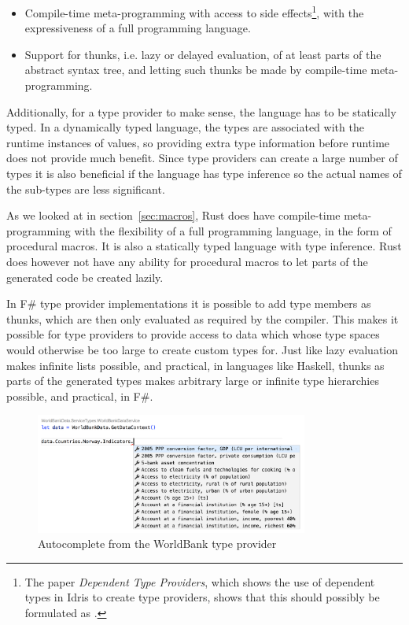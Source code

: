 \begin{itemize}
  \item Compile-time meta-programming with access to side effects\footnote{The paper \emph{Dependent Type Providers}\cite{dependent-type-providers}, which shows the use of dependent types in Idris to create type providers, shows that this should possibly be formulated as .}, with the expressiveness of a full programming language.
  \item Support for thunks, i.e. lazy or delayed evaluation, of at least parts of the abstract syntax tree, and letting such thunks be made by compile-time meta-programming.
\end{itemize}

Additionally, for a type provider to make sense, the language has to be statically typed. In a dynamically typed language, the types are associated with the runtime instances of values, so providing extra type information before runtime does not provide much benefit. Since type providers can create a large number of types it is also beneficial if the language has type inference so the actual names of the sub-types are less significant.

As we looked at in section~\ref{sec:macros}, Rust does have compile-time meta-programming with the flexibility of a full programming language, in the form of procedural macros. It is also a statically typed language with type inference. Rust does however not have any ability for procedural macros to let parts of the generated code be created lazily.

In F\# type provider implementations it is possible to add type members as thunks, which are then only evaluated as required by the compiler. This makes it possible for type providers to provide access to data which whose type spaces would otherwise be too large to create custom types for. Just like lazy evaluation makes infinite lists possible, and practical, in languages like Haskell, thunks as parts of the generated types makes arbitrary large or infinite type hierarchies possible, and practical, in F\#.

\begin{figure}[ht!]
\begin{center}
\includegraphics[width=0.8\textwidth]{worldbank_autocomplete}
\end{center}
\hspace*{-1.5in} %
\caption{Autocomplete from the WorldBank type provider}
\label{fig:worldbank-autocomplete}
\end{figure}

